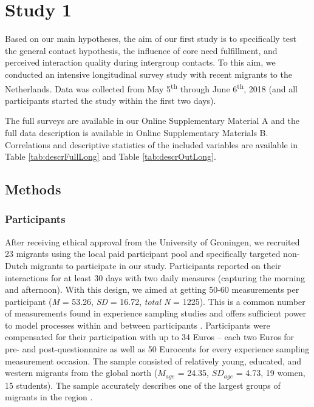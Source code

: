 \section{Study 1}

Based on our main hypotheses, the aim of our first study is to
specifically test the general contact hypothesis, the influence of core
need fulfillment, and perceived interaction quality during intergroup
contacts. To this aim, we conducted an intensive longitudinal survey
study with recent migrants to the Netherlands. Data was collected from
May 5\textsuperscript{th} through June 6\textsuperscript{th}, 2018 (and
all participants started the study within the first two days).

The full surveys are available in our Online Supplementary Material A
and the full data description is available in Online Supplementary
Materials B. Correlations and descriptive statistics of the included
variables are available in Table \ref{tab:descrFullLong} and Table
\ref{tab:descrOutLong}.

\subsection{Methods}

\subsubsection{Participants}

After receiving ethical approval from the University of Groningen, we
recruited 23 migrants using the local paid participant pool and
specifically targeted non-Dutch migrants to participate in our study.
Participants reported on their interactions for at least 30 days with
two daily measures (capturing the morning and afternoon). With this
design, we aimed at getting 50-60 measurements per participant
(\textit{M} = 53.26, \textit{SD} = 16.72, \textit{total N} = 1225). This
is a common number of measurements found in experience sampling studies
and offers sufficient power to model processes within and between
participants \citep[e.g., for a systematic review see][]{AanhetRot2012}.
Participants were compensated for their participation with up to 34
Euros -- each two Euros for pre- and post-questionnaire as well as 50
Eurocents for every experience sampling measurement occasion. The sample
consisted of relatively young, educated, and western migrants from the
global north (\(M_{age}\) = 24.35, \(SD_{age}\) = 4.73, 19 women, 15
students). The sample accurately describes one of the largest groups of
migrants in the region \citep[][]{GemeenteGroningen2015}.

